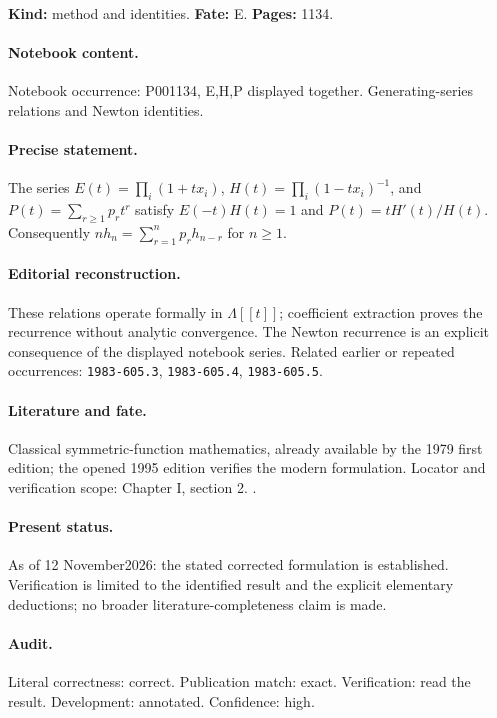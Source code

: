\label{item:1983-608.11}

\noindent\textbf{Kind:} method and identities. \textbf{Fate:} E. \textbf{Pages:} 1134.\par

\paragraph{Notebook content.} Notebook occurrence: P001134, E,H,P displayed together. Generating-series relations and Newton identities.

\paragraph{Precise statement.} The series \(E(t)=\prod_i(1+tx_i)\), \(H(t)=\prod_i(1-tx_i)^{-1}\), and \(P(t)=\sum_{r\ge1}p_rt^r\) satisfy \(E(-t)H(t)=1\) and \(P(t)=tH'(t)/H(t)\). Consequently \(nh_n=\sum_{r=1}^np_rh_{n-r}\) for \(n\ge1\).

\paragraph{Editorial reconstruction.} These relations operate formally in \(\Lambda[[t]]\); coefficient extraction proves the recurrence without analytic convergence. The Newton recurrence is an explicit consequence of the displayed notebook series. Related earlier or repeated occurrences: \texttt{1983-605.3}, \texttt{1983-605.4}, \texttt{1983-605.5}.

\paragraph{Literature and fate.} Classical symmetric-function mathematics, already available by the 1979 first edition; the opened 1995 edition verifies the modern formulation. Locator and verification scope: Chapter I, section 2. \cite{macdonald1995symmetric}.

\paragraph{Present status.} As of 12 November2026: the stated corrected formulation is established. Verification is limited to the identified result and the explicit elementary deductions; no broader literature-completeness claim is made.

\paragraph{Audit.} Literal correctness: correct. Publication match: exact. Verification: read the result. Development: annotated. Confidence: high.

